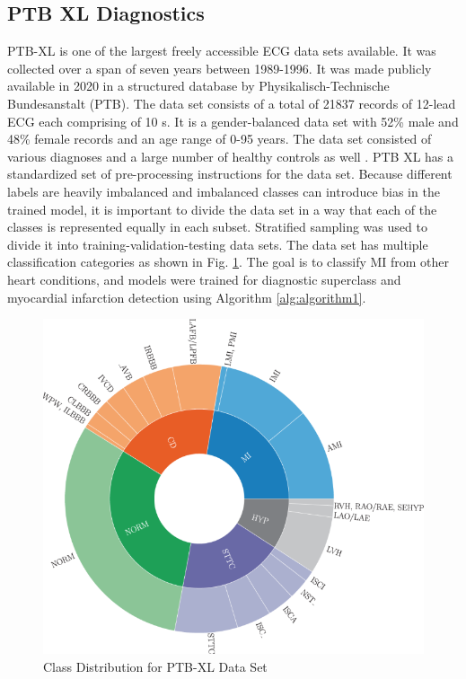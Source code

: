 \documentclass{ieeeaccess}
\begin{document}
\subsection{PTB XL Diagnostics}
PTB-XL is one of the largest freely accessible ECG data sets available. It was collected over a span of seven years between 1989-1996. It was made publicly available in 2020 in a structured database by Physikalisch-Technische Bundesanstalt (PTB). The data set consists of a total of 21837 records of 12-lead ECG each comprising of 10 s. It is a gender-balanced data set with 52\% male and 48\% female records and an age range of 0-95 years. The data set consisted of various diagnoses and a large number of healthy controls as well \cite{9190034}. 
PTB XL has a standardized set of pre-processing instructions for the data set. Because different labels are heavily imbalanced and imbalanced classes can introduce bias in the trained model, it is important to divide the data set in a way that each of the classes is represented equally in each subset. Stratified sampling was used to divide it into training-validation-testing data sets. The data set has multiple classification categories as shown in Fig. \ref{fig:CD-ptbxl}. The goal is to classify MI from other heart conditions, and models were trained for diagnostic superclass and myocardial infarction detection using Algorithm \ref{alg:algorithm1}.  
\begin{figure}[!ht]
\includegraphics[scale=0.35]{Definitions/ptb-xl.jpeg}
\caption{Class Distribution for PTB-XL Data Set}
\label{fig:CD-ptbxl}
\end{figure} 
\end{document}
